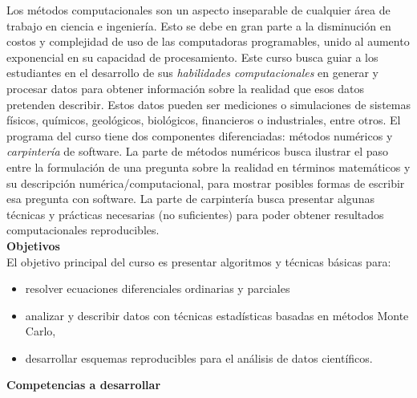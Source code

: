 \documentclass[letterpaper,10pt,onecolumn]{article}
\begin{document}
\noindent\normalsize Los m\'etodos computacionales son un aspecto
inseparable de cualquier \'area de trabajo en ciencia e ingenier\'ia.
Esto se debe en gran parte a la disminuci\'on en costos y complejidad
de uso de las computadoras programables, unido al aumento
exponencial en su capacidad de procesamiento.
Este curso busca guiar a los estudiantes en el desarrollo de sus
\emph{habilidades computacionales} en generar y procesar
datos para obtener informaci\'on sobre la realidad que esos datos
pretenden  describir.  
Estos datos pueden ser mediciones o simulaciones de
sistemas f\'isicos, qu\'imicos, geol\'ogicos, biol\'ogicos,
financieros o industriales, entre otros.     
El programa del curso tiene dos componentes diferenciadas: m\'etodos
num\'ericos  y \emph{carpinter\'ia} de software.  
La parte de m\'etodos num\'ericos busca ilustrar el paso entre la
formulaci\'on de una pregunta sobre la realidad en t\'erminos
matem\'aticos y su descripci\'on num\'erica/computacional, para
mostrar posibles formas de escribir esa pregunta con software.   
La parte de carpinter\'ia busca presentar algunas t\'ecnicas y
pr\'acticas necesarias (no suficientes) para poder obtener resultados
computacionales reproducibles.   
\\[0.1cm] 

\noindent\textbf{\large {} \quad Objetivos}\\[-0.2cm]

\noindent\normalsize El objetivo principal del curso es presentar
algoritmos y t\'ecnicas b\'asicas para:

\begin{itemize}
\item resolver ecuaciones
  diferenciales ordinarias y parciales\\[-0.6cm]
\item analizar y describir datos con t\'ecnicas estad\'isticas basadas
  en m\'etodos Monte Carlo, \\[-0.6cm]
\item desarrollar esquemas reproducibles para el an\'alisis de datos cient\'ificos. \\[-0.6cm]
\end{itemize}
\vspace*{0.5cm} 

\noindent\textbf{\large {} \quad Competencias a
  desarrollar}\\[-0.2cm] 
\end{document}
